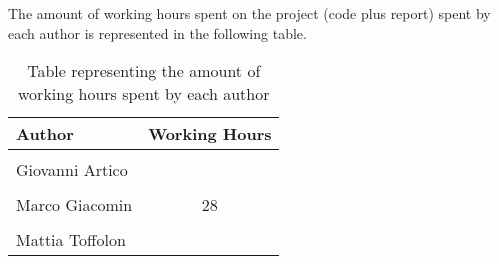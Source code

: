 \begin{flushleft}
The amount of working hours spent on the project (code plus report) spent by each author is represented in the following table.
\end{flushleft}
\begin{table}[h]
    \centering
    \begin{tabular}{|l|c|}
        \hline
        \textbf{Author} & \textbf{Working Hours} \\ \hline
        \\[-1em]
        Giovanni Artico & \\ \hline
        \\[-1em]
        Marco Giacomin & 28 \\ \hline
        \\[-1em]
        Mattia Toffolon & \\ \hline
    \end{tabular}
    \caption{Table representing the amount of working hours spent by each author}
\end{table}